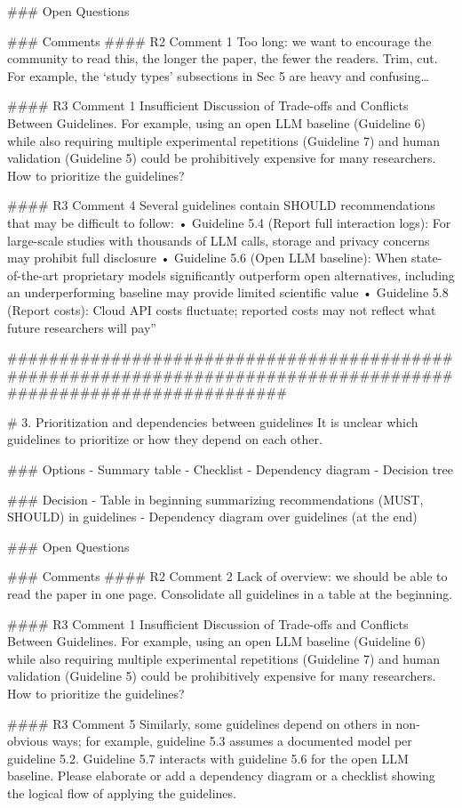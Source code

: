 ### Open Questions

### Comments
#### R2 Comment 1
Too long: we want to encourage the community to read this, the longer the paper, the fewer the readers. Trim, cut. For example, the ‘study types’ subsections in Sec 5 are heavy and confusing…

#### R3 Comment 1
Insufficient Discussion of Trade-offs and Conflicts Between Guidelines. For example, using an open LLM baseline (Guideline 6) while also requiring multiple experimental repetitions (Guideline 7) and human validation (Guideline 5) could be prohibitively expensive for many researchers. How to prioritize the guidelines?

#### R3 Comment 4
Several guidelines contain SHOULD recommendations that may be difficult to follow:
	•	Guideline 5.4 (Report full interaction logs): For large-scale studies with thousands of LLM calls, storage and privacy concerns may prohibit full disclosure
	•	Guideline 5.6 (Open LLM baseline): When state-of-the-art proprietary models significantly outperform open alternatives, including an underperforming baseline may provide limited scientific value
	•	Guideline 5.8 (Report costs): Cloud API costs fluctuate; reported costs may not reflect what future researchers will pay”


#################################################################################################################

# 3. Prioritization and dependencies between guidelines
It is unclear which guidelines to prioritize or how they depend on each other.

### Options
- Summary table
- Checklist
- Dependency diagram
- Decision tree

### Decision
- Table in beginning summarizing recommendations (MUST, SHOULD) in guidelines 
- Dependency diagram over guidelines (at the end)

### Open Questions

### Comments
#### R2 Comment 2
Lack of overview: we should be able to read the paper in one page. Consolidate all guidelines in a table at the beginning.

#### R3 Comment 1
Insufficient Discussion of Trade-offs and Conflicts Between Guidelines. For example, using an open LLM baseline (Guideline 6) while also requiring multiple experimental repetitions (Guideline 7) and human validation (Guideline 5) could be prohibitively expensive for many researchers. How to prioritize the guidelines?

#### R3 Comment 5
Similarly, some guidelines depend on others in non-obvious ways; for example, guideline 5.3 assumes a documented model per guideline 5.2. Guideline 5.7 interacts with guideline 5.6 for the open LLM baseline. Please elaborate or add a dependency diagram or a checklist showing the logical flow of applying the guidelines.

